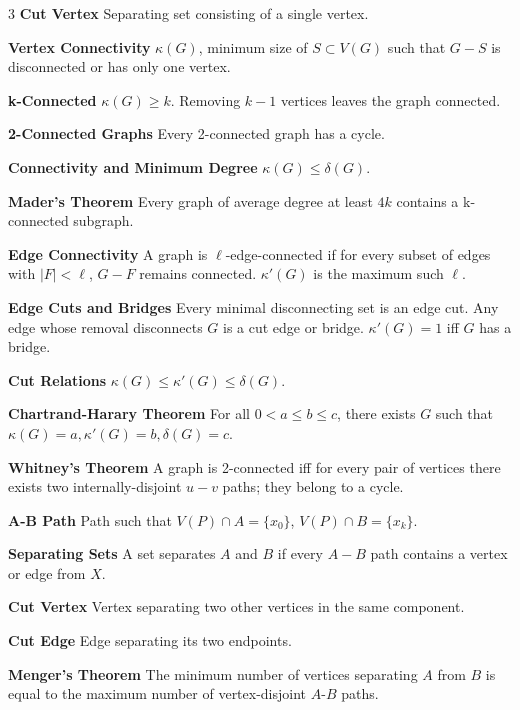 \documentclass[10pt, landscape]{article}
\begin{document}
\begin{multicols*}{3}
\textbf{Cut Vertex} Separating set consisting of a single vertex.

\textbf{Vertex Connectivity} $\kappa(G)$, minimum size of $S \subset V(G)$ such that $G-S$ is disconnected or has only one vertex.

\textbf{k-Connected} $\kappa(G) \geq k$. Removing $k-1$ vertices leaves the graph connected.

\textbf{2-Connected Graphs} Every 2-connected graph has a cycle.

\textbf{Connectivity and Minimum Degree} $\kappa(G) \leq \delta(G)$.

\textbf{Mader's Theorem} Every graph of average degree at least $4k$ contains a k-connected subgraph.

\textbf{Edge Connectivity} A graph is $\ell$-edge-connected if for every subset of edges with $|F| < \ell$, $G-F$ remains connected. $\kappa'(G)$ is the maximum such $\ell$.

\textbf{Edge Cuts and Bridges} Every minimal disconnecting set is an edge cut. Any edge whose removal disconnects $G$ is a cut edge or bridge. $\kappa'(G)=1$ iff $G$ has a bridge.

\textbf{Cut Relations} $\kappa(G) \leq \kappa'(G) \leq \delta(G)$.

\textbf{Chartrand-Harary Theorem} For all $0 < a \leq b \leq c$, there exists $G$ such that $\kappa(G)=a, \kappa'(G)=b, \delta(G)=c$.

\textbf{Whitney's Theorem} A graph is 2-connected iff for every pair of vertices there exists two internally-disjoint $u-v$ paths; they belong to a cycle.

\textbf{A-B Path} Path such that $V(P) \cap A = \{ x_0 \}$, $V(P) \cap B = \{x_k\}$.

\textbf{Separating Sets} A set separates $A$ and $B$ if every $A-B$ path contains a vertex or edge from $X$.

\textbf{Cut Vertex} Vertex separating two other vertices in the same component.

\textbf{Cut Edge} Edge separating its two endpoints.

\textbf{Menger's Theorem} The minimum number of vertices separating $A$ from $B$ is equal to the maximum number of vertex-disjoint $A$-$B$ paths.



\end{multicols*}
\end{document}
